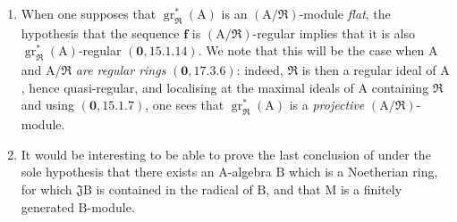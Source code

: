 \begin{remarks}[19.7.2]
\label{IV.19.7.2}
\medskip\noindent
\begin{enumerate}
\item[\rm(i)] When one supposes that $\operatorname{gr}_\mathfrak{R}^*(\mathrm{A})$ is an $(\mathrm{A}/\mathfrak{R})$-module \emph{flat}, the hypothesis that the sequence $\mathbf{f}$ is $(\mathrm{A}/\mathfrak{R})$-regular implies that it is also $\operatorname{gr}_\mathfrak{R}^*(\mathrm{A})$-regular $(\mathbf{0},15.1.14)$. We note that this will be the case when $\mathrm{A}$ and $\mathrm{A}/\mathfrak{R}$ \emph{are regular rings} $(\mathbf{0},17.3.6)$: indeed, $\mathfrak{R}$ is then a regular ideal of $\mathrm{A}$ , hence quasi-regular, and localising at the maximal ideals of $\mathrm{A}$ containing $\mathfrak{R}$ and using $(\mathbf{0},15.1.7)$, one sees that $\operatorname{gr}_\mathfrak{R}^*(\mathrm{A})$ is a \emph{projective} $(\mathrm{A}/\mathfrak{R})$-module.
\item[\rm(ii)] It would be interesting to be able to prove the last conclusion of  under the sole hypothesis that there exists an $\mathrm{A}$-algebra $\mathrm{B}$ which is a Noetherian ring, for which $\mathfrak{J}\mathrm{B}$ is contained in the radical of $\mathrm{B}$, and that $\mathrm{M}$ is a finitely generated $\mathrm{B}$-module.
\end{enumerate}
\end{remarks}

